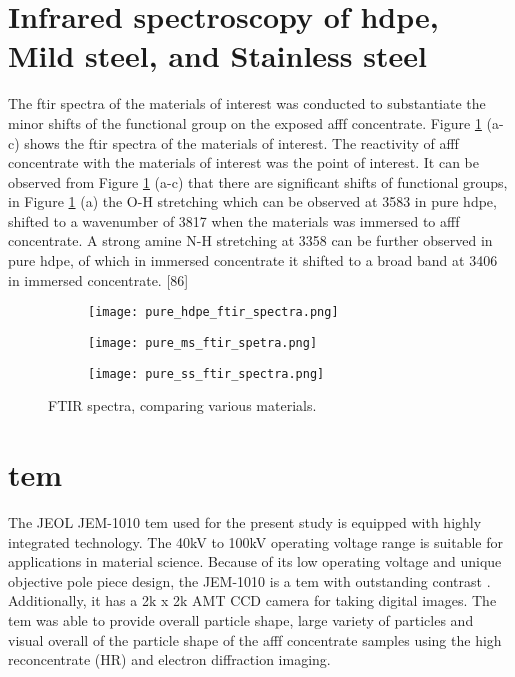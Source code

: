 \section{Infrared spectroscopy of \acrshort{hdpe}, Mild steel, and Stainless steel}  
The \acrshort{ftir} spectra of the materials of interest was conducted to substantiate the minor shifts of the functional group on the exposed \acrshort{afff} concentrate. Figure \ref{ch5:figure:materials} (a-c) shows the \acrshort{ftir} spectra of the materials of interest. The reactivity of \acrshort{afff} concentrate with the materials of interest was the point of interest. It can be observed from Figure \ref{ch5:figure:materials} (a-c) that there are significant shifts of functional groups, in Figure \ref{ch5:figure:materials} (a) the O-H stretching which can be observed at 3583 in pure \acrshort{hdpe}, shifted to a wavenumber of 3817 when the materials was immersed to \acrshort{afff} concentrate. A strong amine N-H stretching at 3358 can be further observed in pure \acrshort{hdpe}, of which in immersed concentrate it shifted to a broad band at 3406 in immersed concentrate. [86]

\begin{figure}[H]
\centering

\begin{subfigure}{.45\textwidth}
    \texttt{[image: pure\_hdpe\_ftir\_spectra.png]}
    \caption{}
\end{subfigure}
\begin{subfigure}{.45\textwidth}
    \texttt{[image: pure\_ms\_ftir\_spetra.png]}
    \caption{}
\end{subfigure}
\begin{subfigure}{.45\textwidth}
    \texttt{[image: pure\_ss\_ftir\_spectra.png]}
    \caption{}
\end{subfigure}

\caption{FTIR spectra, comparing various materials.}
\label{ch5:figure:materials}
\end{figure}

\section{\Acrfull{tem}}
The JEOL JEM-1010 \acrshort{tem} used for the present study is equipped with highly integrated technology. The 40kV to 100kV operating voltage range is suitable for applications in material science. Because of its low operating voltage and unique objective pole piece design, the JEM-1010 is a \acrshort{tem} with outstanding contrast \cite{krimm1986vibrational}. Additionally, it has a 2k x 2k AMT CCD camera for taking digital images. The \acrshort{tem} was able to provide overall particle shape, large variety of particles and visual overall of the particle shape of the \acrshort{afff} concentrate samples using the high reconcentrate (HR) and electron diffraction imaging.  

